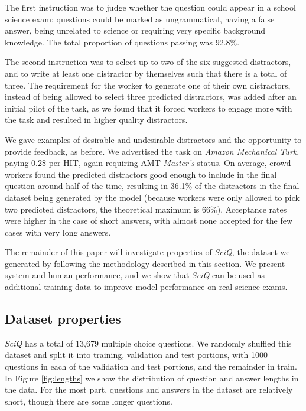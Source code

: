The first instruction was to judge whether the question could appear in a school science exam; questions could be marked as ungrammatical, having a false answer, being unrelated to science or requiring very specific background knowledge.  The total proportion of questions passing was
$92.8\%$.

The second instruction was to select up to two of the six suggested distractors, and to write at least one distractor by themselves such that there is a total of three. The requirement for the worker to generate one of their own distractors, instead of being allowed to select three predicted distractors, was added after an initial pilot of the task, as we found that it forced workers to engage more with the task and resulted in higher quality distractors.

We gave examples of desirable and undesirable distractors and the opportunity to provide feedback, as before. We advertised the task on \emph{Amazon Mechanical Turk}, paying 0.2\$ per HIT, again requiring AMT \emph{Master's} status.  On average, crowd workers found the predicted distractors good enough to include in the final question around half of the time, resulting in 36.1\% of the distractors in the final dataset being generated by the model (because workers were only allowed to pick two predicted distractors, the theoretical maximum is 66\%).  Acceptance rates were higher in the case of short answers, with almost none accepted for the few cases with very long answers.

The remainder of this paper will investigate properties of \emph{SciQ}, the dataset we generated by following the methodology described in this section. We present system and human performance, and we show that \emph{SciQ} can be used as additional training data to improve model performance on real science exams.

\subsection{Dataset properties}

\emph{SciQ} has a total of 13,679 multiple choice questions.  We randomly shuffled this dataset and split it into training, validation and test portions, with 1000 questions in each of the validation and test portions, and the remainder in train.  In Figure \ref{fig:lengths} we show the distribution of question and answer lengths in the data. For the most part, questions and answers in the dataset are relatively short, though there are some longer questions.

